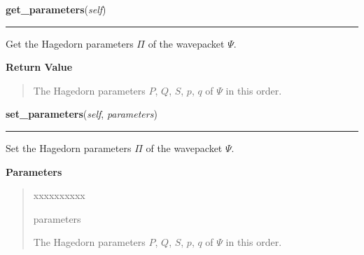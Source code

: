     \label{HagedornWavepacket:HagedornWavepacket:get_parameters}

    \vspace{0.5ex}

\hspace{.8\funcindent}\begin{boxedminipage}{\funcwidth}

    \raggedright \textbf{get\_parameters}(\textit{self})

    \vspace{-1.5ex}

    \rule{\textwidth}{0.5\fboxrule}
\setlength{\parskip}{2ex}
    Get the Hagedorn parameters $\Pi$ of the wavepacket
    $\Psi$.

\setlength{\parskip}{1ex}
      \textbf{Return Value}
    \vspace{-1ex}

      \begin{quote}
      The Hagedorn parameters $P$, $Q$, $S$, $p$, $q$ of
      $\Psi$ in this order.

      \end{quote}

    \end{boxedminipage}

    \label{HagedornWavepacket:HagedornWavepacket:set_parameters}

    \vspace{0.5ex}

\hspace{.8\funcindent}\begin{boxedminipage}{\funcwidth}

    \raggedright \textbf{set\_parameters}(\textit{self}, \textit{parameters})

    \vspace{-1.5ex}

    \rule{\textwidth}{0.5\fboxrule}
\setlength{\parskip}{2ex}
    Set the Hagedorn parameters $\Pi$ of the wavepacket
    $\Psi$.

\setlength{\parskip}{1ex}
      \textbf{Parameters}
      \vspace{-1ex}

      \begin{quote}
        \begin{Ventry}{xxxxxxxxxx}

          \item[parameters]

          The Hagedorn parameters $P$, $Q$, $S$, $p$, $q$ of
          $\Psi$ in this order.

        \end{Ventry}

      \end{quote}

    \end{boxedminipage}

